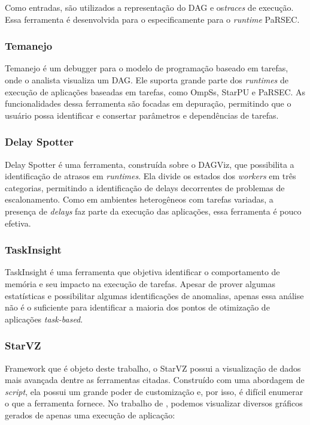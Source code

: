 \documentclass[prop-esp]{iiufrgs}
\begin{document}
Como entradas, são utilizados a representação do DAG e os\emph{traces} de execução. Essa ferramenta é desenvolvida para o especificamente para o \emph{runtime} PaRSEC.

\subsubsection*{Temanejo}

Temanejo \cite{ref:temanejo} é um debugger para o modelo de programação baseado em tarefas, onde o analista visualiza um DAG. Ele suporta grande parte dos 
\emph{runtimes} de execução de aplicações baseadas em tarefas, como OmpSs, StarPU e PaRSEC. As funcionalidades dessa ferramenta são focadas em depuração, permitindo que o usuário possa identificar e consertar parâmetros e dependências de tarefas.

\subsubsection*{Delay Spotter}

Delay Spotter \cite{ref:delayspotter} é uma ferramenta, construída sobre o DAGViz, que possibilita a identificação de atrasos em \emph{runtimes}.
Ela divide os estados dos \emph{workers} em três categorias, permitindo a identificação de delays decorrentes de problemas de escalonamento.
Como em ambientes heterogêneos com tarefas variadas, a presença de \emph{delays} faz parte da execução das aplicações, essa ferramenta é pouco efetiva.

\subsubsection*{TaskInsight}

TaskInsight \cite{ref:taskinsight} é uma ferramenta que objetiva identificar o comportamento de memória e seu impacto na execução de tarefas. 
Apesar de prover algumas estatísticas e possibilitar algumas identificações de anomalias, apenas essa análise não é o suficiente para
identificar a maioria dos pontos de otimização de aplicações \emph{task-based}.

\subsubsection*{StarVZ}

Framework que é objeto deste trabalho, o StarVZ \cite{ref:starvz} possui a visualização de dados mais avançada dentre as ferramentas citadas.
Construído com uma abordagem de \emph{script}, ela possui um grande poder de customização e, por isso, é difícil enumerar o que a ferramenta fornece.
No trabalho de \citet{ref:starvz}, podemos visualizar diversos gráficos gerados de apenas uma execução de aplicação:
\end{document}
